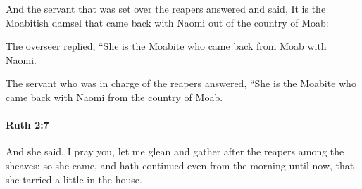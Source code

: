			\begin{versebox}
					\item[BHS] 
					\item[LXX] 
					\item[ASV] And the servant that was set over the reapers answered and said, It is the Moabitish damsel that came back with Naomi out of the country of Moab:
					\item[NIV] The overseer replied, “She is the Moabite who came back from Moab with Naomi.
					\item[NRSV] The servant who was in charge of the reapers answered, “She is the Moabite who came back with Naomi from the country of Moab.
			\end{versebox}

		\paragraph{Ruth 2:7} %
			\label{RUTH-2-7}

			And she said, I pray you, let me glean and gather after the reapers among the sheaves: so she came, and hath continued even from the morning until now, that she tarried a little in the house.

